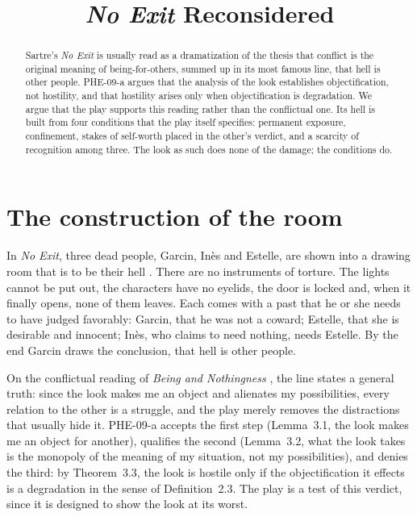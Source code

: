 \documentclass{situationist-preprint}
\title{\emph{No Exit} Reconsidered}
\begin{document}
\maketitle

\begin{abstract}
Sartre's \emph{No Exit} is usually read as a dramatization of the thesis that conflict is the original meaning of being-for-others, summed up in its most famous line, that hell is other people. PHE-09-a argues that the analysis of the look establishes objectification, not hostility, and that hostility arises only when objectification is degradation. We argue that the play supports this reading rather than the conflictual one. Its hell is built from four conditions that the play itself specifies: permanent exposure, confinement, stakes of self-worth placed in the other's verdict, and a scarcity of recognition among three. The look as such does none of the damage; the conditions do.
\end{abstract}

\section{The construction of the room}

In \emph{No Exit}, three dead people, Garcin, Inès and Estelle, are shown into a drawing room that is to be their hell \citep{Sartre1944}. There are no instruments of torture. The lights cannot be put out, the characters have no eyelids, the door is locked and, when it finally opens, none of them leaves. Each comes with a past that he or she needs to have judged favorably: Garcin, that he was not a coward; Estelle, that she is desirable and innocent; Inès, who claims to need nothing, needs Estelle. By the end Garcin draws the conclusion, that hell is other people.

On the conflictual reading of \emph{Being and Nothingness} \citep{Sartre1943}, the line states a general truth: since the look makes me an object and alienates my possibilities, every relation to the other is a struggle, and the play merely removes the distractions that usually hide it. PHE-09-a accepts the first step (Lemma~3.1, the look makes me an object for another), qualifies the second (Lemma~3.2, what the look takes is the monopoly of the meaning of my situation, not my possibilities), and denies the third: by Theorem~3.3, the look is hostile only if the objectification it effects is a degradation in the sense of Definition~2.3. The play is a test of this verdict, since it is designed to show the look at its worst.
\end{document}
